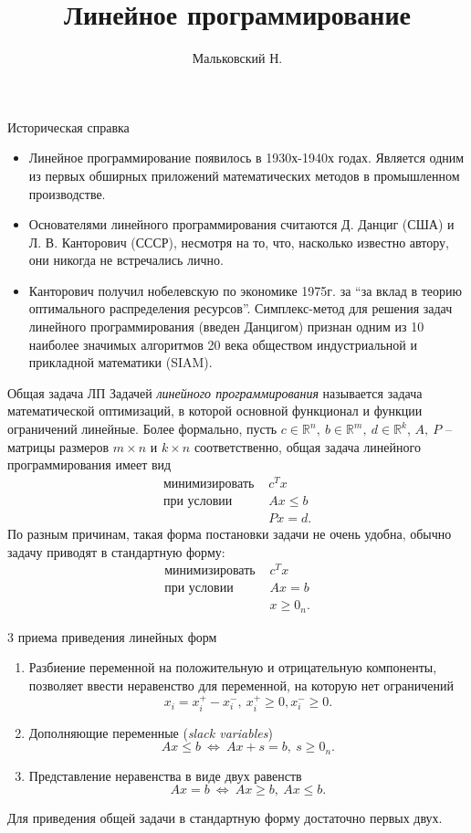 \documentclass[10pt]{beamer}
\author{Мальковский Н.}
\title[Линейное программирование]{Линейное программирование}
\institute[СПбГУ]{Санкт-Петербургский Государственный Университет}
\date{}
\begin{document}
\begin{frame}
\titlepage
\end{frame}

\begin{frame}{Историческая справка}
\begin{itemize}
\item Линейное программирование появилось в 1930х-1940х годах. Является одним из первых обширных приложений математических методов в промышленном производстве.
\item Основателями линейного программирования считаются Д. Данциг (США) и Л. В. Канторович (СССР), несмотря на то, что, насколько известно автору, они никогда не встречались лично.
\item Канторович получил нобелевскую по экономике 1975г. за ``за вклад в теорию оптимального распределения ресурсов''. Симплекс-метод для решения задач линейного программирования (введен Данцигом) признан одним из 10 наиболее значимых алгоритмов 20 века обществом индустриальной и прикладной математики (SIAM).
\end{itemize}
\end{frame}

\begin{frame}{Общая задача ЛП}
Задачей \textit{линейного программирования} называется задача математической оптимизаций, в которой основной функционал и функции ограничений линейные. Более формально, пусть $c\in\mathbb{R}^n,~b\in\mathbb{R}^m,~d\in\mathbb{R}^k$, $A,~P$ -- матрицы размеров $m\times n$ и $k\times n$ соответственно, общая задача линейного программирования имеет вид
$$
\begin{array}{ll}
\mbox{минимизировать } & c^Tx \\ 
\mbox{при условии }    & Ax\leq b\\
& Px=d.
\end{array}
$$
По разным причинам, такая форма постановки задачи не очень удобна, обычно задачу приводят в стандартную форму:
$$
\begin{array}{ll}
\mbox{минимизировать } & c^Tx \\ 
\mbox{при условии }    & Ax=b\\
& x\geq 0_n.
\end{array}
$$

\end{frame}


\begin{frame}{3 приема приведения линейных форм}
\begin{enumerate}
\item Разбиение переменной на положительную и отрицательную компоненты, позволяет ввести неравенство для переменной, на которую нет ограничений
$$
x_i=x^+_i-x^-_i,~ x^+_i\geq 0, x^-_i\geq 0.
$$
\item Дополняющие переменные (\textit{slack variables})
$$
Ax\leq b~\Leftrightarrow~Ax+s=b,~s\geq 0_n.
$$
\item Представление неравенства в виде двух равенств
$$
Ax=b~\Leftrightarrow~Ax\geq b,~Ax\leq b.
$$
\end{enumerate}
Для приведения общей задачи в стандартную форму достаточно первых двух.
\end{frame}
\end{document}
